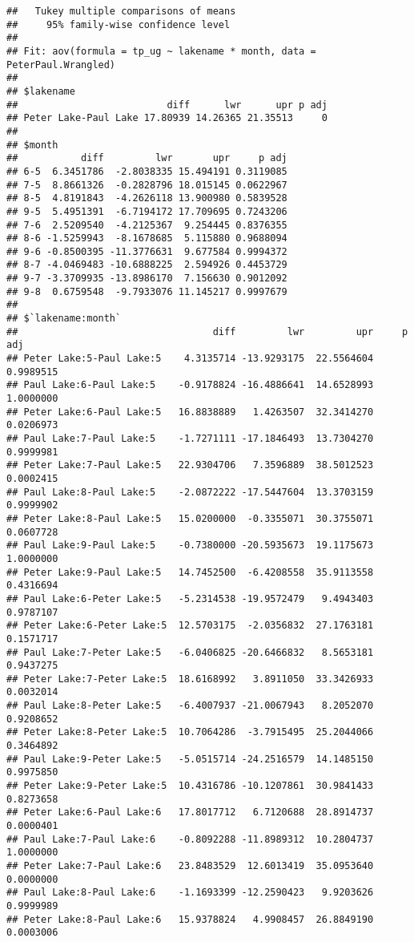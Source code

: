 \documentclass[]{article}
\begin{document}
\begin{verbatim}
##   Tukey multiple comparisons of means
##     95% family-wise confidence level
## 
## Fit: aov(formula = tp_ug ~ lakename * month, data = PeterPaul.Wrangled)
## 
## $lakename
##                          diff      lwr      upr p adj
## Peter Lake-Paul Lake 17.80939 14.26365 21.35513     0
## 
## $month
##           diff         lwr       upr     p adj
## 6-5  6.3451786  -2.8038335 15.494191 0.3119085
## 7-5  8.8661326  -0.2828796 18.015145 0.0622967
## 8-5  4.8191843  -4.2626118 13.900980 0.5839528
## 9-5  5.4951391  -6.7194172 17.709695 0.7243206
## 7-6  2.5209540  -4.2125367  9.254445 0.8376355
## 8-6 -1.5259943  -8.1678685  5.115880 0.9688094
## 9-6 -0.8500395 -11.3776631  9.677584 0.9994372
## 8-7 -4.0469483 -10.6888225  2.594926 0.4453729
## 9-7 -3.3709935 -13.8986170  7.156630 0.9012092
## 9-8  0.6759548  -9.7933076 11.145217 0.9997679
## 
## $`lakename:month`
##                                  diff         lwr         upr     p adj
## Peter Lake:5-Paul Lake:5    4.3135714 -13.9293175  22.5564604 0.9989515
## Paul Lake:6-Paul Lake:5    -0.9178824 -16.4886641  14.6528993 1.0000000
## Peter Lake:6-Paul Lake:5   16.8838889   1.4263507  32.3414270 0.0206973
## Paul Lake:7-Paul Lake:5    -1.7271111 -17.1846493  13.7304270 0.9999981
## Peter Lake:7-Paul Lake:5   22.9304706   7.3596889  38.5012523 0.0002415
## Paul Lake:8-Paul Lake:5    -2.0872222 -17.5447604  13.3703159 0.9999902
## Peter Lake:8-Paul Lake:5   15.0200000  -0.3355071  30.3755071 0.0607728
## Paul Lake:9-Paul Lake:5    -0.7380000 -20.5935673  19.1175673 1.0000000
## Peter Lake:9-Paul Lake:5   14.7452500  -6.4208558  35.9113558 0.4316694
## Paul Lake:6-Peter Lake:5   -5.2314538 -19.9572479   9.4943403 0.9787107
## Peter Lake:6-Peter Lake:5  12.5703175  -2.0356832  27.1763181 0.1571717
## Paul Lake:7-Peter Lake:5   -6.0406825 -20.6466832   8.5653181 0.9437275
## Peter Lake:7-Peter Lake:5  18.6168992   3.8911050  33.3426933 0.0032014
## Paul Lake:8-Peter Lake:5   -6.4007937 -21.0067943   8.2052070 0.9208652
## Peter Lake:8-Peter Lake:5  10.7064286  -3.7915495  25.2044066 0.3464892
## Paul Lake:9-Peter Lake:5   -5.0515714 -24.2516579  14.1485150 0.9975850
## Peter Lake:9-Peter Lake:5  10.4316786 -10.1207861  30.9841433 0.8273658
## Peter Lake:6-Paul Lake:6   17.8017712   6.7120688  28.8914737 0.0000401
## Paul Lake:7-Paul Lake:6    -0.8092288 -11.8989312  10.2804737 1.0000000
## Peter Lake:7-Paul Lake:6   23.8483529  12.6013419  35.0953640 0.0000000
## Paul Lake:8-Paul Lake:6    -1.1693399 -12.2590423   9.9203626 0.9999989
## Peter Lake:8-Paul Lake:6   15.9378824   4.9908457  26.8849190 0.0003006

\end{verbatim}
\end{document}
